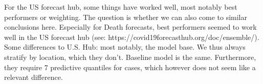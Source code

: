 For the US forecast hub, some things have worked well, most notably best performers or weighting. The question is whether we can also come to similar conclusions here. Especially for Death forecasts, best performers seemed to work well in the US forecast hub (see: https://covid19forecasthub.org/doc/ensemble/).\\
Some differences to U.S. Hub: most notably, the model base. We thus always stratify by location, which they don't. Baseline model is the same. Furthermore, they require 7 predictive quantiles for cases, which however does not seem like a relevant difference.
